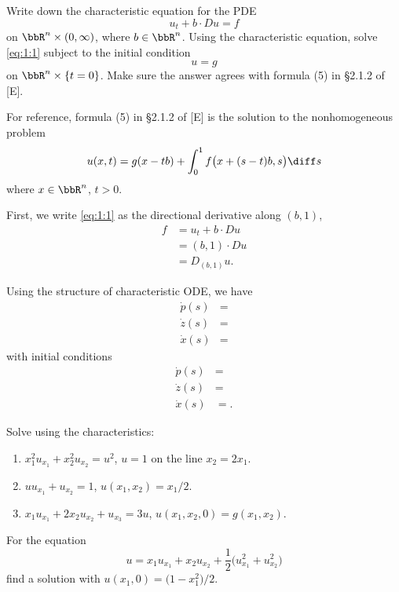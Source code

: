 \begin{problem}
  Write down the characteristic equation for the PDE
  \[
    \label{eq:1:1}
    \tag{\(*\)}
    u_t+b\cdot Du=f
  \]
  on \(\bbR^n\times(0,\infty)\), where \(b\in\bbR^n\). Using the
  characteristic equation, solve \eqref{eq:1:1} subject to the initial
  condition
  \[
    u=g
  \]
  on \(\bbR^n\times\{t=0\}\). Make sure the answer agrees with formula (5)
  in \S 2.1.2 of [E].
\end{problem}
\begin{solution}
  For reference, formula (5) in \S 2.1.2 of [E] is the solution to the
  nonhomogeneous problem
  \[
    u(x,t)=g(x -tb)+\int_0^1 f\bigl(x+(s-t)b,s\bigr)\diff s
  \]
  where \(x\in\bbR^n\), \(t>0\).

  First, we write \eqref{eq:1:1} as the directional derivative along
  \((b,1)\),
  \begin{align*}
    f%
    &=u_t+b\cdot Du\\
    &=(b,1)\cdot Du\\
    &=D_{(b,1)} u.
  \end{align*}

  Using the structure of characteristic ODE, we have
  \begin{align*}
    \dot p(s)&=\\
    \dot z(s)&=\\
    \dot x(s)&=
  \end{align*}
  with initial conditions
  \begin{align*}
    \dot p(s)&=\\
    \dot z(s)&=\\
    \dot x(s)&=.
  \end{align*}
\end{solution}
\newpage

\begin{problem}
  Solve using the characteristics:
  \begin{enumerate}[label=(\alph*)]
  \item \(x_1^2u_{x_1}+x_2^2u_{x_2}=u^2\), \(u=1\) on the line
    \(x_2=2x_1\).
  \item \(uu_{x_1}+u_{x_2}=1\), \(u(x_1,x_2)=x_1/2\).
  \item \(x_1u_{x_1}+2x_2u_{x_2}+u_{x_3}=3u\),
    \(u(x_1,x_2,0)=g(x_1,x_2)\).
  \end{enumerate}
\end{problem}
\begin{solution}

\end{solution}
\newpage

\begin{problem}
  For the equation
  \[
    u=x_1u_{x_1}+x_2u_{x_2}
    +\frac{1}{2}\bigl(u_{x_1}^2+u_{x_2}^2\bigr)
  \]
  find a solution with \(u(x_1,0)=\bigl(1-x_1^2\bigr)/2\).
\end{problem}
\begin{solution}

\end{solution}

